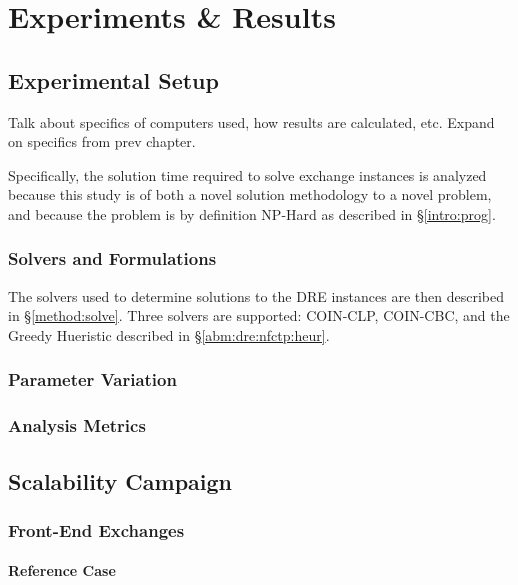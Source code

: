 \chapter{Experiments \& Results}\label{ch:results}

\section{Experimental Setup}

Talk about specifics of computers used, how results are calculated, etc. Expand on specifics from prev chapter.

Specifically, the solution
time required to solve exchange instances is analyzed because this study is of
both a novel solution methodology to a novel problem, and because the problem is
by definition NP-Hard as described in \S \ref{intro:prog}.

\subsection{Solvers and Formulations}

The solvers used to determine solutions to the DRE instances are then described
in \S \ref{method:solve}. Three solvers are supported: COIN-CLP, COIN-CBC, and
the Greedy Hueristic described in \S \ref{abm:dre:nfctp:heur}.

\subsection{Parameter Variation}

\subsection{Analysis Metrics}

\section{Scalability Campaign}

\subsection{Front-End Exchanges}

\subsubsection{Reference Case}

